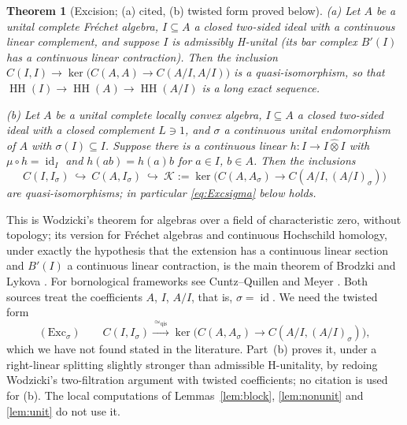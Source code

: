 \documentclass[11pt]{amsart}
\newtheorem{theorem}{Theorem}[section]
\theoremstyle{definition}
\theoremstyle{remark}
\newcommand{\id}{\operatorname{id}}
\newcommand{\HH}{\operatorname{HH}}
\begin{document}
\begin{theorem}[Excision; (a) cited, (b) twisted form proved below]\label{thm:excision-input}
(a) Let $A$ be a unital complete Fr\'echet algebra, $I\subseteq A$ a closed
two-sided ideal with a continuous linear complement, and suppose $I$ is
admissibly H-unital (its bar complex $B'(I)$ has a continuous linear
contraction).  Then the inclusion $C(I,I)\to\ker\bigl(C(A,A)\to
C(A/I,A/I)\bigr)$ is a quasi-isomorphism, so that
$\HH(I)\to\HH(A)\to\HH(A/I)$ is a long exact sequence.

(b) Let $A$ be a unital complete locally convex algebra, $I\subseteq A$ a
closed two-sided ideal with a closed complement $L\ni1$, and $\sigma$ a
continuous unital endomorphism of $A$ with $\sigma(I)\subseteq I$.  Suppose
there is a continuous linear $h:I\to I\widehat\otimes I$ with $\mu\circ
h=\id_I$ and $h(ab)=h(a)b$ for $a\in I$, $b\in A$.  Then the inclusions
\[
C(I,I_\sigma)\ \hookrightarrow\ C(A,I_\sigma)\ \hookrightarrow\
\mathcal K:=\ker\bigl(C(A,A_\sigma)\to C(A/I,(A/I)_\sigma)\bigr)
\]
are quasi-isomorphisms; in particular \eqref{eq:Excsigma} below holds.
\end{theorem}

This is Wodzicki's theorem \cite[Theorem~3.1]{Wodzicki} for algebras over a
field of characteristic zero, without topology; its version for Fr\'echet
algebras and continuous Hochschild homology, under exactly the hypothesis that
the extension has a continuous linear section and $B'(I)$ a continuous linear
contraction, is the main theorem of Brodzki and Lykova \cite{BrodzkiLykova}.  For bornological frameworks see Cuntz--Quillen
\cite{CuntzQuillen} and Meyer \cite{MeyerCyclic}.
Both sources treat the coefficients $A$, $I$, $A/I$, that is, $\sigma=\id$.
We need the twisted form
\begin{equation}\label{eq:Excsigma}
(\mathrm{Exc}_{\sigma})\qquad
C(I,I_{\sigma})\xrightarrow{\ \simeq_{\mathrm{qis}}\ }
\ker\bigl(C(A,A_{\sigma})\to C(A/I,(A/I)_{\sigma})\bigr),
\end{equation}
which we have not found stated in the literature.  Part~(b) proves it, under
a right-linear splitting slightly stronger than admissible H-unitality, by
redoing Wodzicki's two-filtration argument with twisted coefficients; no
citation is used for (b).  The local computations of
Lemmas~\ref{lem:block}, \ref{lem:nonunit} and \ref{lem:unit} do not use it.
\end{document}
